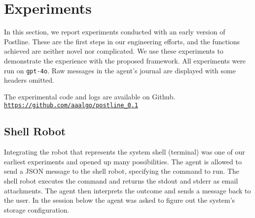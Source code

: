 \section{Experiments}

In this section, we report experiments conducted with an early version of Postline. These are the first steps in our engineering efforts, and the functions achieved are neither novel nor complicated. We use these experiments to demonstrate the experience with the proposed framework. All experiments were run on \texttt{gpt-4o}. Raw messages in the agent's journal are displayed with some headers omitted.

The experimental code and logs are available on Github.\\
\texttt{\url{https://github.com/aaalgo/postline_0.1}}

\subsection{Shell Robot}

Integrating the robot that represents the system shell (terminal) was
one of our earliest experiments and opened up many possibilities. The
agent is allowed to send a JSON message to the shell robot, specifying
the command to run. The shell robot executes the command and returns
the stdout and stderr as email attachments. The agent then interprets
the outcome and sends a message back to the user.  In the session
below the agent was asked to figure out the system's storage
configuration.

